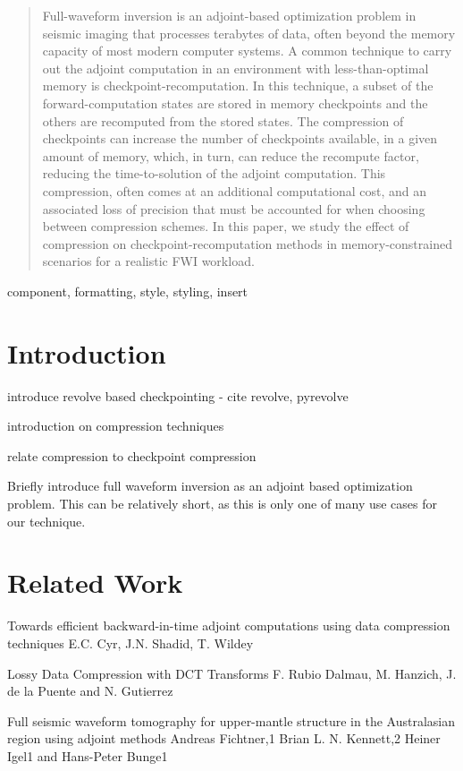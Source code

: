 \documentclass[conference]{IEEEtran}
\begin{document}
\begin{abstract}
Full-waveform inversion is an adjoint-based optimization problem in
seismic imaging that processes terabytes of data, often beyond the
memory capacity of most modern computer systems. A common technique to
carry out the adjoint computation in an environment with
less-than-optimal memory is checkpoint-recomputation. In this
technique, a subset of the forward-computation states are stored in
memory checkpoints and the others are recomputed from the stored
states. The compression of checkpoints can increase the number of
checkpoints available, in a given amount of memory, which, in turn,
can reduce the recompute factor, reducing the time-to-solution of the
adjoint computation. This compression, often comes at an additional
computational cost, and an associated loss of precision that must be
accounted for when choosing between compression schemes. In this
paper, we study the effect of compression on checkpoint-recomputation
methods in memory-constrained scenarios for a realistic FWI workload.
\end{abstract}

\begin{IEEEkeywords}
component, formatting, style, styling, insert
\end{IEEEkeywords}

\section{Introduction}
introduce revolve based checkpointing - cite revolve, pyrevolve

introduction on compression techniques

relate compression to checkpoint compression

Briefly introduce full waveform inversion as an adjoint based optimization
problem. This can be relatively short, as this is only one of many use cases
for our technique.


\section{Related Work}

Towards efficient backward-in-time adjoint computations using data
compression techniques E.C. Cyr, J.N. Shadid, T. Wildey

Lossy Data Compression with DCT Transforms F. Rubio Dalmau,
M. Hanzich, J. de la Puente and N. Gutierrez 

Full seismic waveform tomography for upper-mantle structure in the
Australasian region using adjoint methods
Andreas Fichtner,1 Brian L. N. Kennett,2 Heiner Igel1 and Hans-Peter
Bunge1
\end{document}
